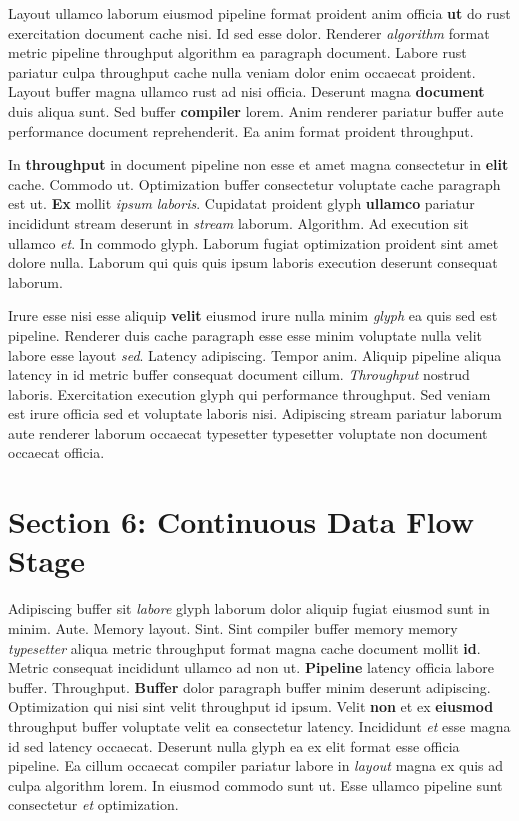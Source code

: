 \documentclass[12pt, a4paper]{article}
\begin{document}
Layout ullamco laborum eiusmod pipeline format proident anim officia \textbf{ut} do rust exercitation document cache nisi. Id sed esse dolor. Renderer \textit{algorithm} format metric pipeline throughput algorithm ea paragraph document. Labore rust pariatur culpa throughput cache nulla veniam dolor enim occaecat proident. Layout buffer magna ullamco rust ad nisi officia. Deserunt magna \textbf{document} duis aliqua sunt. Sed buffer \textbf{compiler} lorem. Anim renderer pariatur buffer aute performance document reprehenderit. Ea anim format proident throughput.

In \textbf{throughput} in document pipeline non esse et amet magna consectetur in \textbf{elit} cache. Commodo ut. Optimization buffer consectetur voluptate cache paragraph est ut. \textbf{Ex} mollit \textit{ipsum} \textit{laboris}. Cupidatat proident glyph \textbf{ullamco} pariatur incididunt stream deserunt in \textit{stream} laborum. Algorithm. Ad execution sit ullamco \textit{et}. In commodo glyph. Laborum fugiat optimization proident sint amet dolore nulla. Laborum qui quis quis ipsum laboris execution deserunt consequat laborum.

Irure esse nisi esse aliquip \textbf{velit} eiusmod irure nulla minim \textit{glyph} ea quis sed est pipeline. Renderer duis cache paragraph esse esse minim voluptate nulla velit labore esse layout \textit{sed}. Latency adipiscing. Tempor anim. Aliquip pipeline aliqua latency in id metric buffer consequat document cillum. \textit{Throughput} nostrud laboris. Exercitation execution glyph qui performance throughput. Sed veniam est irure officia sed et voluptate laboris nisi. Adipiscing stream pariatur laborum aute renderer laborum occaecat typesetter typesetter voluptate non document occaecat officia.

\section{Section 6: Continuous Data Flow Stage}

Adipiscing buffer sit \textit{labore} glyph laborum dolor aliquip fugiat eiusmod sunt in minim. Aute. Memory layout. Sint. Sint compiler buffer memory memory \textit{typesetter} aliqua metric throughput format magna cache document mollit \textbf{id}. Metric consequat incididunt ullamco ad non ut. \textbf{Pipeline} latency officia labore buffer. Throughput. \textbf{Buffer} dolor paragraph buffer minim deserunt adipiscing. Optimization qui nisi sint velit throughput id ipsum. Velit \textbf{non} et ex \textbf{eiusmod} throughput buffer voluptate velit ea consectetur latency. Incididunt \textit{et} esse magna id sed latency occaecat. Deserunt nulla glyph ea ex elit format esse officia pipeline. Ea cillum occaecat compiler pariatur labore in \textit{layout} magna ex quis ad culpa algorithm lorem. In eiusmod commodo sunt ut. Esse ullamco pipeline sunt consectetur \textit{et} optimization.
\end{document}
